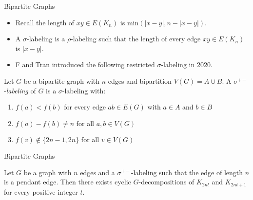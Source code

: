 \documentclass[11pt,serif,professionalfont,aspectratio=169]{beamer}
\theoremstyle{plain}
\begin{document}
\begin{frame}{Bipartite Graphs}
\begin{itemize}
    \item Recall the length of  $xy \in E(K_n)$ is min$(|x-y|,n-|x-y|).$
    \item A $\sigma$-labeling is a $\rho$-labeling such that the length of every edge $xy \in E(K_n)$ is $|x-y|.$
    \pause
    \item F and Tran introduced the following restricted $\sigma$-labeling in 2020.
\end{itemize}
\begin{definition}
 Let $G$ be a bipartite graph with $n$ edges and bipartition $V(G)=A\cup B$. A $\sigma^{+-}$-\emph{labeling} of $G$ is a $\sigma$-labeling with:
\begin{enumerate}
    \item $f(a)<f(b)$ for every edge $ab\in E(G)$ with $a\in A$ and $b \in B$
    \item $f(a)-f(b) \neq n$ for all $a,b \in V(G)$
    \item $f(v) \not \in \{2n-1,2n\}$ for all $v \in V(G)$
\end{enumerate}   
\end{definition}    

\end{frame}
\begin{frame}{Bipartite Graphs}
    \begin{theorem} [F, Tran, 2020] 
Let $G$ be a graph with $n$ edges and a $\sigma^{+-}$-labeling such that the edge of length $n$ is a pendant edge. Then there exists cyclic $G$-decompositions of $K_{2nt}$ and $K_{2nt+1}$ for every positive integer $t.$
\end{theorem}

\end{frame}
\end{document}
